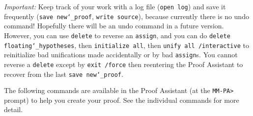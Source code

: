 {\em Important:} Keep track of your work with a log file (\texttt{open
log}) and save it frequently (\texttt{save new{\char`\_}proof},
\texttt{write source}), because currently there is no undo command!
Hopefully there will be an undo command in a future version.
However, you can use \texttt{delete} to reverse an \texttt{assign}, and
you can do \texttt{delete floating{\char`\_}hypotheses}, then
\texttt{initialize all}, then \texttt{unify all /interactive} to
reinitialize bad unifications made accidentally or by bad
\texttt{assign}s.  You cannot reverse a \texttt{delete} except by
\texttt{exit /force} then reentering the Proof Assistant to recover from
the last \texttt{save new{\char`\_}proof}.

The following commands are available in the Proof Assistant (at the
\texttt{MM-PA>} prompt) to help you create your proof.  See the
individual commands for more detail.

